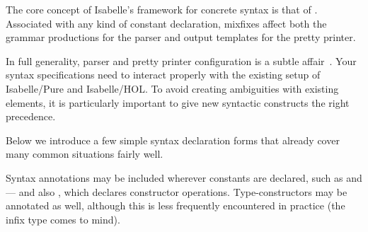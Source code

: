 %
\begin{isabellebody}%
\def\isabellecontext{Documents}%
%
\isadelimtheory
%
\endisadelimtheory
%
\isatagtheory
%
\endisatagtheory
{\isafoldtheory}%
%
\isadelimtheory
%
\endisadelimtheory
%
\isamarkuptrue%
%
\begin{isamarkuptext}%
The core concept of Isabelle's framework for concrete syntax is that
  of .  Associated with any kind of
  constant declaration, mixfixes affect both the grammar productions
  for the parser and output templates for the pretty printer.

  In full generality, parser and pretty printer configuration is a
  subtle affair~\cite{isabelle-ref}.  Your syntax specifications need
  to interact properly with the existing setup of Isabelle/Pure and
  Isabelle/HOL\@.  To avoid creating ambiguities with existing
  elements, it is particularly important to give new syntactic
  constructs the right precedence.

  Below we introduce a few simple syntax declaration
  forms that already cover many common situations fairly well.%
\end{isamarkuptext}%
\isamarkuptrue%
%
\isamarkuptrue%
%
\begin{isamarkuptext}%
Syntax annotations may be included wherever constants are declared,
  such as  and  --- and also
  , which declares constructor operations.
  Type-constructors may be annotated as well, although this is less
  frequently encountered in practice (the infix type \isa{{\isasymtimes}} comes
  to mind).


\end{isamarkuptext}
\end{isabellebody}
